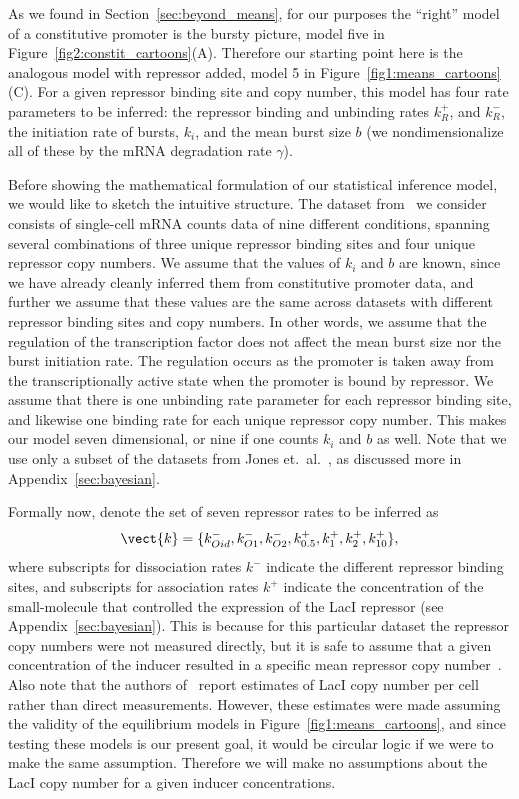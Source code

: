 As we found in Section~\ref{sec:beyond_means}, for our purposes the ``right''
model of a constitutive promoter is the bursty picture, model five in
Figure~\ref{fig2:constit_cartoons}(A). Therefore our starting point here is the
analogous model with repressor added, model 5 in
Figure~\ref{fig1:means_cartoons}(C). For a given repressor binding site and copy
number, this model has four rate parameters to be inferred: the repressor
binding and unbinding rates $k_R^+$, and $k_R^-$, the initiation rate of bursts,
$k_i$, and the mean burst size $b$ (we nondimensionalize all of these by the
mRNA degradation rate $\gamma$).

Before showing the mathematical formulation of our statistical inference model,
we would like to sketch the intuitive structure. The dataset
from~\cite{Jones2014} we consider consists of single-cell mRNA counts data of
nine different conditions, spanning several combinations of three unique
repressor binding sites and four unique repressor copy numbers. We assume that
the values of $k_i$ and $b$ are known, since we have already cleanly inferred
them from constitutive promoter data, and further we assume that these values
are the same across datasets with different repressor binding sites and copy
numbers. In other words, we assume that the regulation of the transcription
factor does not affect the mean burst size nor the burst initiation rate. The
regulation occurs as the promoter is taken away from the transcriptionally
active state when the promoter is bound by repressor. We assume that there is
one unbinding rate parameter for each repressor binding site, and likewise one
binding rate for each unique repressor copy number. This makes our model seven
dimensional, or nine if one counts $k_i$ and $b$ as well. Note that we use only
a subset of the datasets from Jones et.\ al.~\cite{Jones2014}, as discussed more
in Appendix~\ref{sec:bayesian}.

Formally now, denote the set of seven repressor rates to be inferred as
\begin{equation}
\vect{k} =\{k_{Oid}^-, k_{O1}^-, k_{O2}^-,
k_{0.5}^+, k_{1}^+, k_{2}^+, k_{10}^+\},
\end{equation}
where subscripts for dissociation rates $k^-$  indicate the different repressor
binding sites, and subscripts for association rates $k^+$ indicate the
concentration of the small-molecule that controlled the expression of the LacI
repressor (see Appendix~\ref{sec:bayesian}). This is because for this particular
dataset the repressor copy numbers were not measured directly, but it is safe to
assume that a given concentration of the inducer resulted in a specific mean
repressor copy number~\cite{Chure2019a}. Also note that the authors
of~\cite{Jones2014} report estimates of LacI copy number per cell rather than
direct measurements. However, these estimates were made assuming the validity of
the equilibrium models in Figure~\ref{fig1:means_cartoons}, and since testing
these models is our present goal, it would be circular logic if we were to make
the same assumption. Therefore we will make no assumptions about the LacI copy
number for a given inducer concentrations.

